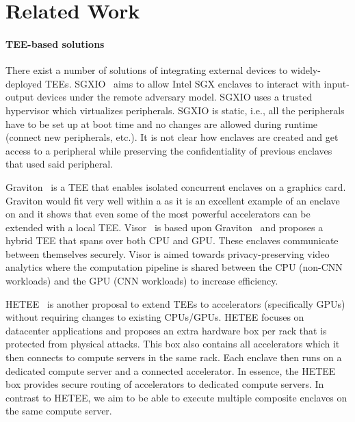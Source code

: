 \section{Related Work}
\label{sec:relatedWork}


\setcounter{para}{0}
\paragraph{TEE-based solutions} There exist a number of solutions of integrating external devices to widely-deployed TEEs. SGXIO~\cite{weiser2017sgxio} aims to allow Intel SGX enclaves to interact with input-output devices under the remote adversary model. SGXIO uses a trusted hypervisor which virtualizes peripherals. SGXIO is static, i.e., all the peripherals have to be set up at boot time and no changes are allowed during runtime (connect new peripherals, etc.). It is not clear how enclaves are created and get access to a peripheral while preserving the confidentiality of previous enclaves that used said peripheral. 

Graviton~\cite{volos2018graviton} is a TEE that enables isolated concurrent enclaves on a graphics card. Graviton would fit very well within a \name{} as it is an excellent example of an enclave on \sphw and it shows that even some of the most powerful accelerators can be extended with a local TEE. Visor~\cite{visor} is based upon Graviton~\cite{volos2018graviton} and proposes a hybrid TEE that spans over both CPU and GPU. These enclaves communicate between themselves securely. Visor is aimed towards privacy-preserving video analytics where the computation pipeline is shared between the CPU (non-CNN workloads) and the GPU (CNN workloads) to increase efficiency. 

HETEE~\cite{zhu2020hetee} is another proposal to extend TEEs to accelerators (specifically GPUs) without requiring changes to existing CPUs/GPUs. HETEE focuses on datacenter applications and proposes an extra hardware box per rack that is protected from physical attacks. This box also contains all accelerators which it then connects to compute servers in the same rack. Each enclave then runs on a dedicated compute server and a connected accelerator. In essence, the HETEE box provides secure routing of accelerators to dedicated compute servers. In contrast to HETEE, we aim to be able to execute multiple composite enclaves on the same compute server. 


